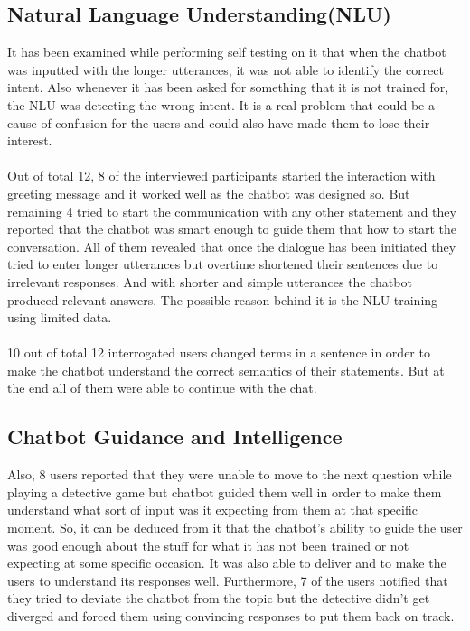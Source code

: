 \subsection{Natural Language Understanding(NLU)}
It has been examined while performing self testing on it that when the chatbot was inputted with the longer utterances, it was not able to identify the correct intent. Also whenever it has been asked for something that it is not trained for, the NLU was detecting the wrong intent. It is a real problem that could be a cause of confusion for the users and could also have made them to lose their interest.
\\~\\
Out of total 12, 8 of the interviewed participants started the interaction with greeting message and it worked well as the chatbot was designed so. But remaining 4 tried to start the communication with any other statement and they reported that the chatbot was smart enough to guide them that how to start the conversation. All of them revealed that once the dialogue has been initiated they tried to enter longer utterances but overtime shortened their sentences due to irrelevant responses. And with shorter and simple utterances the chatbot produced relevant answers. The possible reason behind it is the NLU training using limited data.
\\~\\
10 out of total 12 interrogated users changed terms in a sentence in order to make the chatbot understand the correct semantics of their statements. But at the end all of them were able to continue with the chat.

\subsection{Chatbot Guidance and Intelligence}
Also, 8 users reported that they were unable to move to the next question while playing a detective game but chatbot guided them well in order to make them understand what sort of input was it expecting from them at that specific moment. So, it can be deduced from it that the chatbot's ability to guide the user was good enough about the stuff for what it has not been trained or not expecting at some specific occasion. It was also able to deliver and to make the users to understand its responses well. Furthermore, 7 of the users notified that they tried to deviate the chatbot from the topic but the detective didn't get diverged and forced them using convincing responses to put them back on track.

